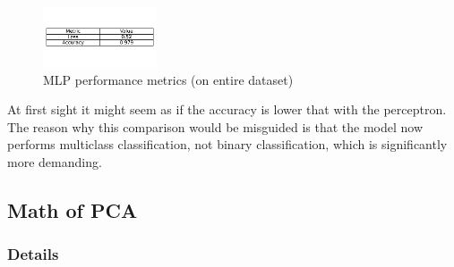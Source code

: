 \documentclass{article}
\begin{document}
\begin{figure}[h!]
    \centering
    \includegraphics[width=0.3\textwidth]{./plots/plot10.png}  %
    \caption{MLP performance metrics (on entire dataset)}
    \label{fig:plot8}  %
\end{figure}

At first sight it might seem as if the accuracy is lower that with the perceptron.
The reason why this comparison would be misguided is that the model now performs multiclass classification, not binary classification, which is significantly more demanding.


\subsection{Math of PCA}
\subsubsection{Details}
\end{document}

